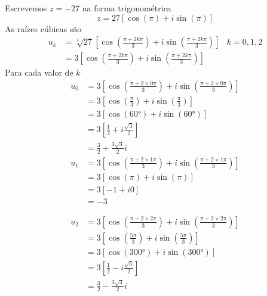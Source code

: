 \documentclass[a4paper,12pt,fleqn]{article}
\begin{document}
\begin{answer}
  Escrevemos \( z = -27 \) na forma trigonométrica
  \[
  z = 27 \left[ \cos\left(\pi\right) + i \sin\left(\pi\right) \right]
  \]
  As raízes cúbicas são
  \begin{align*}
    u_k
    & = \sqrt[3]{27} \left[
    \cos\left(\frac{\pi+2k\pi}{3}\right)
    + i \sin\left(\frac{\pi+2k\pi}{3}\right)
    \right]
    & k = 0, 1, 2    \\[2mm]
    & = 3 \left[
    \cos\left(\frac{\pi+2k\pi}{3}\right)
    + i \sin\left(\frac{\pi+2k\pi}{3}\right)
    \right]
  \end{align*}
  Para cada valor de $k$
  \begin{align*}
    u_0
    & = 3 \left[
    \cos\left( \frac{\pi+2\times 0\pi}{3} \right)
    + i \sin\left( \frac{\pi+2\times 0\pi}{3} \right)
    \right] \\[2mm]
    & = 3 \left[
    \cos\left( \frac{\pi}{3} \right)
    + i \sin\left( \frac{\pi}{3} \right)
    \right] \\[2mm]
    & = 3 \left[
    \cos\left( \ang{60} \right)
    + i \sin\left( \ang{60} \right)
    \right] \\[2mm]
    & = 3 \left[
    \frac{1}{2}
    + i \frac{\sqrt{3}}{2}
    \right] \\[2mm]
    & =  \frac{3}{2} + \frac{3\sqrt{3}}{2} i
  \end{align*}
  \begin{align*}
    u_1
    & = 3 \left[
    \cos\left( \frac{\pi+2\times 1\pi}{3} \right)
    + i \sin\left( \frac{\pi+2\times 1\pi}{3} \right)
    \right] \\[2mm]
    & = 3 \left[
    \cos\left( \pi \right)
    + i \sin\left( \pi \right)
    \right] \\[2mm]
    & = 3 \left[ -1 + i0 \right] \\[2mm]
    & = -3
  \end{align*}

  \begin{align*}
    u_2
    & = 3 \left[
    \cos\left( \frac{\pi+2\times 2\pi}{3} \right)
    + i \sin\left( \frac{\pi+2\times 2\pi}{3} \right)
    \right] \\[2mm]
    & = 3 \left[
    \cos\left( \frac{5\pi}{3} \right)
    + i \sin\left( \frac{5\pi}{3} \right)
    \right] \\[2mm]
    & = 3 \left[
    \cos\left( \ang{300} \right)
    + i \sin\left( \ang{300} \right)
    \right] \\[2mm]
    & = 3 \left[
    \frac{1}{2}
    - i \frac{\sqrt{3}}{2}
    \right] \\[2mm]
    & = \frac{3}{2} - \frac{3\sqrt{3}}{2}i
  \end{align*}
\end{answer}

\end{document}
